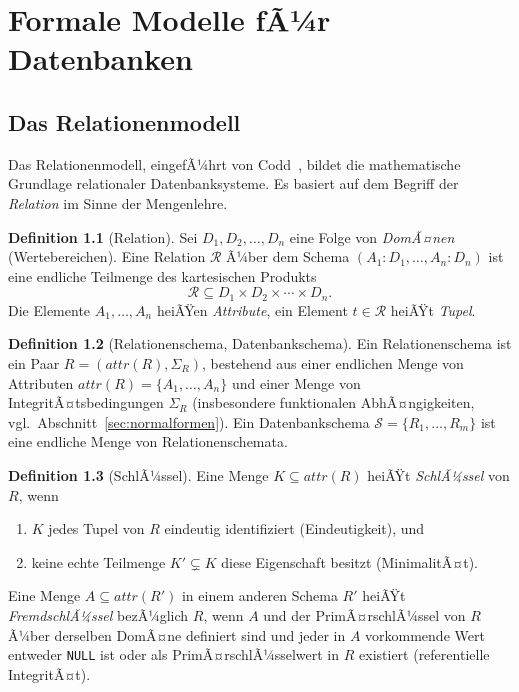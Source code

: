 ﻿\documentclass[a4paper,12pt]{report}
\theoremstyle{definition}
\newtheorem{definition}{Definition}[chapter]
\theoremstyle{remark}
\newcommand{\R}{\mathcal{R}}
\newcommand{\att}{\mathit{attr}}
\begin{document}
\chapter{Formale Modelle fÃ¼r Datenbanken}
\label{ch:modelle}

\section{Das Relationenmodell}
\label{sec:relmodell}

Das Relationenmodell, eingefÃ¼hrt von Codd~\cite{Codd1970}, bildet die
mathematische Grundlage relationaler Datenbanksysteme. Es basiert auf
dem Begriff der \emph{Relation} im Sinne der Mengenlehre.

\begin{definition}[Relation]
\label{def:relation}
Sei $D_1, D_2, \ldots, D_n$ eine Folge von \emph{DomÃ¤nen} (Wertebereichen).
Eine Relation $\R$ Ã¼ber dem Schema $(A_1:D_1, \ldots, A_n:D_n)$ ist eine
endliche Teilmenge des kartesischen Produkts
\[
  \R \subseteq D_1 \times D_2 \times \cdots \times D_n .
\]
Die Elemente $A_1,\ldots,A_n$ heiÃŸen \emph{Attribute}, ein Element
$t \in \R$ heiÃŸt \emph{Tupel}.
\end{definition}

\begin{definition}[Relationenschema, Datenbankschema]
\label{def:relschema}
Ein Relationenschema ist ein Paar $R = (\att(R), \Sigma_R)$, bestehend
aus einer endlichen Menge von Attributen $\att(R) = \{A_1,\ldots,A_n\}$
und einer Menge von IntegritÃ¤tsbedingungen $\Sigma_R$ (insbesondere
funktionalen AbhÃ¤ngigkeiten, vgl.\ Abschnitt~\ref{sec:normalformen}). Ein
Datenbankschema $\mathcal{S} = \{R_1,\ldots,R_m\}$ ist eine endliche
Menge von Relationenschemata.
\end{definition}

\begin{definition}[SchlÃ¼ssel]
\label{def:schluessel}
Eine Menge $K \subseteq \att(R)$ heiÃŸt \emph{SchlÃ¼ssel} von $R$, wenn
\begin{enumerate}
  \item $K$ jedes Tupel von $R$ eindeutig identifiziert (Eindeutigkeit), und
  \item keine echte Teilmenge $K' \subsetneq K$ diese Eigenschaft besitzt
    (MinimalitÃ¤t).
\end{enumerate}
Eine Menge $A \subseteq \att(R')$ in einem anderen Schema $R'$ heiÃŸt
\emph{FremdschlÃ¼ssel} bezÃ¼glich $R$, wenn $A$ und der PrimÃ¤rschlÃ¼ssel von
$R$ Ã¼ber derselben DomÃ¤ne definiert sind und jeder in $A$ vorkommende
Wert entweder \texttt{NULL} ist oder als PrimÃ¤rschlÃ¼sselwert in $R$
existiert (referentielle IntegritÃ¤t).
\end{definition}
\end{document}
